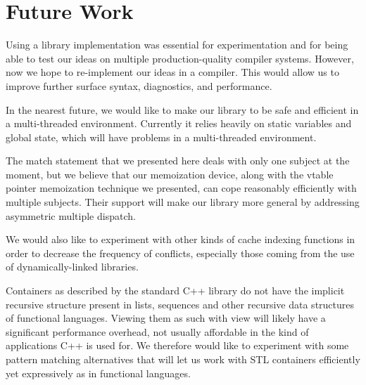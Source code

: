 \section{Future Work} %
\label{sec:fw}

Using a library implementation was essential for experimentation and for being able to
test our ideas on multiple production-quality compiler systems.
However, now we hope to re-implement our ideas in a compiler.
This would allow us to improve further surface syntax, diagnostics, and performance.

In the nearest future, we would like to make our library to be safe and efficient 
in a multi-threaded environment. Currently it relies heavily on static variables 
and global state, which will have problems in a multi-threaded environment. 

The match statement that we presented here deals with only one subject at the 
moment, but we believe that our memoization device, along with the vtable pointer memoization 
technique we presented, can cope reasonably efficiently with multiple subjects. 
Their support will make our library more general by addressing asymmetric 
multiple dispatch.

We would also like to experiment with other kinds of cache indexing functions in 
order to decrease the frequency of conflicts, especially those coming from the use 
of dynamically-linked libraries.

Containers as described by the standard C++ library do not have the implicit 
recursive structure present in lists, sequences and other recursive data 
structures of functional languages. Viewing them as such with view will likely 
have a significant performance overhead, not usually affordable in the kind of 
applications C++ is used for. We therefore would like to experiment with some 
pattern matching alternatives that will let us work with STL containers 
efficiently yet expressively as in functional languages.
%
%
%